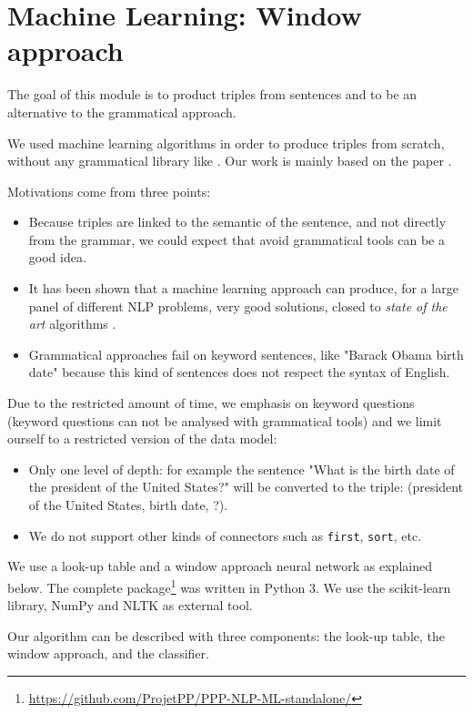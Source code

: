 \section{Machine Learning: Window approach}
\label{mlwindow}

The goal of this module is to product triples from sentences and to be an alternative to the grammatical approach.

We used machine learning algorithms in order to produce triples from scratch, without any grammatical library like \Stanford. Our work is mainly based on the paper \cite{collobert}.

Motivations come from three points:
\begin{itemize}
\item Because triples are linked to the semantic of the sentence, and not directly from the grammar, we could expect that avoid grammatical tools can be a good idea.
\item It has been shown that a machine learning approach can produce, for a large panel of different NLP problems, very good solutions, closed to \textit{state of the art} algorithms \cite{collobert}.
\item Grammatical approaches fail on keyword sentences, like "Barack Obama birth date" because this kind of sentences does not respect the syntax of English.
\end{itemize}

Due to the restricted amount of time, we emphasis on keyword questions (keyword questions can not be analysed with grammatical tools) and we limit ourself to a restricted version of the data model:
\begin{itemize}
\item Only one level of depth: for example the sentence "What is the birth date of the president of the United States?" will be converted to the triple: (president of the United States, birth date, ?).
\item We do not support other kinds of connectors such as \texttt{first}, \texttt{sort}, etc.
\end{itemize}

We use a look-up table and a window approach neural network as explained below. The complete package\footnote{\url{https://github.com/ProjetPP/PPP-NLP-ML-standalone/}} was written in Python 3. We use the scikit-learn library, NumPy and NLTK as external tool.

Our algorithm can be described with three components: the look-up table, the window approach, and the classifier.

